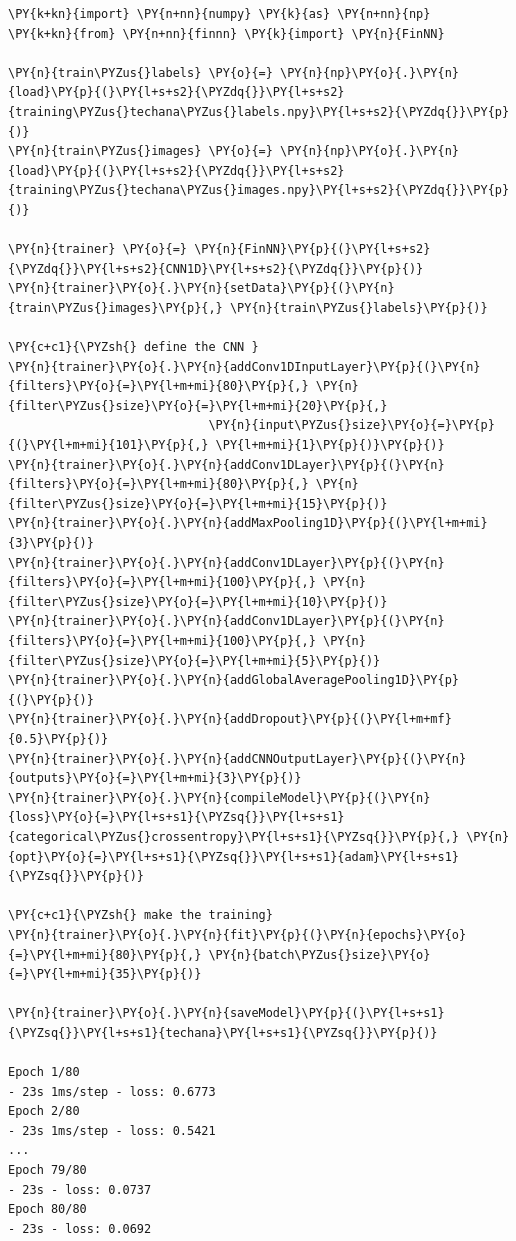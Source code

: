 \begin{tcolorbox}[breakable, size=fbox, boxrule=1pt, pad at break*=1mm,colback=cellbackground, colframe=cellborder]
\begin{Verbatim}[commandchars=\\\{\}]
\PY{k+kn}{import} \PY{n+nn}{numpy} \PY{k}{as} \PY{n+nn}{np}
\PY{k+kn}{from} \PY{n+nn}{finnn} \PY{k}{import} \PY{n}{FinNN}
	
\PY{n}{train\PYZus{}labels} \PY{o}{=} \PY{n}{np}\PY{o}{.}\PY{n}{load}\PY{p}{(}\PY{l+s+s2}{\PYZdq{}}\PY{l+s+s2}{training\PYZus{}techana\PYZus{}labels.npy}\PY{l+s+s2}{\PYZdq{}}\PY{p}{)}
\PY{n}{train\PYZus{}images} \PY{o}{=} \PY{n}{np}\PY{o}{.}\PY{n}{load}\PY{p}{(}\PY{l+s+s2}{\PYZdq{}}\PY{l+s+s2}{training\PYZus{}techana\PYZus{}images.npy}\PY{l+s+s2}{\PYZdq{}}\PY{p}{)}
	
\PY{n}{trainer} \PY{o}{=} \PY{n}{FinNN}\PY{p}{(}\PY{l+s+s2}{\PYZdq{}}\PY{l+s+s2}{CNN1D}\PY{l+s+s2}{\PYZdq{}}\PY{p}{)}
\PY{n}{trainer}\PY{o}{.}\PY{n}{setData}\PY{p}{(}\PY{n}{train\PYZus{}images}\PY{p}{,} \PY{n}{train\PYZus{}labels}\PY{p}{)}
	
\PY{c+c1}{\PYZsh{} define the CNN }
\PY{n}{trainer}\PY{o}{.}\PY{n}{addConv1DInputLayer}\PY{p}{(}\PY{n}{filters}\PY{o}{=}\PY{l+m+mi}{80}\PY{p}{,} \PY{n}{filter\PYZus{}size}\PY{o}{=}\PY{l+m+mi}{20}\PY{p}{,} 
                            \PY{n}{input\PYZus{}size}\PY{o}{=}\PY{p}{(}\PY{l+m+mi}{101}\PY{p}{,} \PY{l+m+mi}{1}\PY{p}{)}\PY{p}{)}
\PY{n}{trainer}\PY{o}{.}\PY{n}{addConv1DLayer}\PY{p}{(}\PY{n}{filters}\PY{o}{=}\PY{l+m+mi}{80}\PY{p}{,} \PY{n}{filter\PYZus{}size}\PY{o}{=}\PY{l+m+mi}{15}\PY{p}{)}
\PY{n}{trainer}\PY{o}{.}\PY{n}{addMaxPooling1D}\PY{p}{(}\PY{l+m+mi}{3}\PY{p}{)}
\PY{n}{trainer}\PY{o}{.}\PY{n}{addConv1DLayer}\PY{p}{(}\PY{n}{filters}\PY{o}{=}\PY{l+m+mi}{100}\PY{p}{,} \PY{n}{filter\PYZus{}size}\PY{o}{=}\PY{l+m+mi}{10}\PY{p}{)}
\PY{n}{trainer}\PY{o}{.}\PY{n}{addConv1DLayer}\PY{p}{(}\PY{n}{filters}\PY{o}{=}\PY{l+m+mi}{100}\PY{p}{,} \PY{n}{filter\PYZus{}size}\PY{o}{=}\PY{l+m+mi}{5}\PY{p}{)}
\PY{n}{trainer}\PY{o}{.}\PY{n}{addGlobalAveragePooling1D}\PY{p}{(}\PY{p}{)}
\PY{n}{trainer}\PY{o}{.}\PY{n}{addDropout}\PY{p}{(}\PY{l+m+mf}{0.5}\PY{p}{)}
\PY{n}{trainer}\PY{o}{.}\PY{n}{addCNNOutputLayer}\PY{p}{(}\PY{n}{outputs}\PY{o}{=}\PY{l+m+mi}{3}\PY{p}{)}
\PY{n}{trainer}\PY{o}{.}\PY{n}{compileModel}\PY{p}{(}\PY{n}{loss}\PY{o}{=}\PY{l+s+s1}{\PYZsq{}}\PY{l+s+s1}{categorical\PYZus{}crossentropy}\PY{l+s+s1}{\PYZsq{}}\PY{p}{,} \PY{n}{opt}\PY{o}{=}\PY{l+s+s1}{\PYZsq{}}\PY{l+s+s1}{adam}\PY{l+s+s1}{\PYZsq{}}\PY{p}{)}
	
\PY{c+c1}{\PYZsh{} make the training}
\PY{n}{trainer}\PY{o}{.}\PY{n}{fit}\PY{p}{(}\PY{n}{epochs}\PY{o}{=}\PY{l+m+mi}{80}\PY{p}{,} \PY{n}{batch\PYZus{}size}\PY{o}{=}\PY{l+m+mi}{35}\PY{p}{)}
	
\PY{n}{trainer}\PY{o}{.}\PY{n}{saveModel}\PY{p}{(}\PY{l+s+s1}{\PYZsq{}}\PY{l+s+s1}{techana}\PY{l+s+s1}{\PYZsq{}}\PY{p}{)}

Epoch 1/80
- 23s 1ms/step - loss: 0.6773
Epoch 2/80
- 23s 1ms/step - loss: 0.5421
...
Epoch 79/80
- 23s - loss: 0.0737
Epoch 80/80
- 23s - loss: 0.0692
\end{Verbatim}
\end{tcolorbox}

